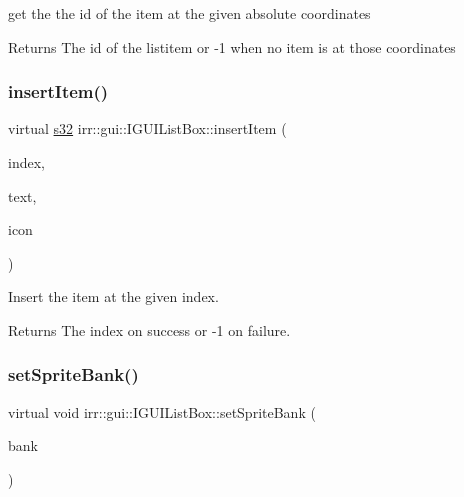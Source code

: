get the the id of the item at the given absolute coordinates 

\begin{DoxyReturn}{Returns}
The id of the listitem or -\/1 when no item is at those coordinates 
\end{DoxyReturn}
\mbox{\label{classirr_1_1gui_1_1IGUIListBox_a1da5cc33687efee5ff1e33ab9f0d5b26}} 
\subsubsection{\texorpdfstring{insert\+Item()}{insertItem()}}
{\footnotesize\ttfamily virtual \hyperlink{namespaceirr_ac66849b7a6ed16e30ebede579f9b47c6}{s32} irr\+::gui\+::\+I\+G\+U\+I\+List\+Box\+::insert\+Item (\begin{DoxyParamCaption}\item[{\hyperlink{namespaceirr_a0416a53257075833e7002efd0a18e804}{u32}}]{index,  }\item[{const wchar\+\_\+t $\ast$}]{text,  }\item[{\hyperlink{namespaceirr_ac66849b7a6ed16e30ebede579f9b47c6}{s32}}]{icon }\end{DoxyParamCaption})\hspace{0.3cm}{\ttfamily [pure virtual]}}



Insert the item at the given index. 

\begin{DoxyReturn}{Returns}
The index on success or -\/1 on failure. 
\end{DoxyReturn}
\mbox{\label{classirr_1_1gui_1_1IGUIListBox_ad139cef6f71bb8d36624b48e8a695ed4}} 
\subsubsection{\texorpdfstring{set\+Sprite\+Bank()}{setSpriteBank()}}
{\footnotesize\ttfamily virtual void irr\+::gui\+::\+I\+G\+U\+I\+List\+Box\+::set\+Sprite\+Bank (\begin{DoxyParamCaption}\item[{\hyperlink{classirr_1_1gui_1_1IGUISpriteBank}{I\+G\+U\+I\+Sprite\+Bank} $\ast$}]{bank }\end{DoxyParamCaption})\hspace{0.3cm}{\ttfamily [pure virtual]}}




